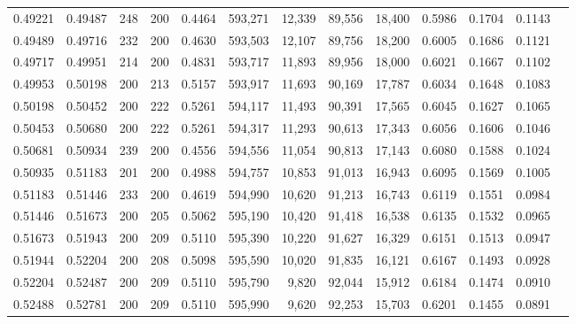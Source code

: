 \begin{tabular}{rrrrrrrrrrrrr}
0.49221 & 0.49487 &    248 & 200 &                                     0.4464 & 593,271 &  12,339 &  89,556 &  18,400 & 0.5986 & 0.1704 & 0.1143 \\
0.49489 & 0.49716 &    232 & 200 &                                     0.4630 & 593,503 &  12,107 &  89,756 &  18,200 & 0.6005 & 0.1686 & 0.1121 \\
0.49717 & 0.49951 &    214 & 200 &                                     0.4831 & 593,717 &  11,893 &  89,956 &  18,000 & 0.6021 & 0.1667 & 0.1102 \\
0.49953 & 0.50198 &    200 & 213 &                                     0.5157 & 593,917 &  11,693 &  90,169 &  17,787 & 0.6034 & 0.1648 & 0.1083 \\
0.50198 & 0.50452 &    200 & 222 &                                     0.5261 & 594,117 &  11,493 &  90,391 &  17,565 & 0.6045 & 0.1627 & 0.1065 \\
0.50453 & 0.50680 &    200 & 222 &                                     0.5261 & 594,317 &  11,293 &  90,613 &  17,343 & 0.6056 & 0.1606 & 0.1046 \\
0.50681 & 0.50934 &    239 & 200 &                                     0.4556 & 594,556 &  11,054 &  90,813 &  17,143 & 0.6080 & 0.1588 & 0.1024 \\
0.50935 & 0.51183 &    201 & 200 &                                     0.4988 & 594,757 &  10,853 &  91,013 &  16,943 & 0.6095 & 0.1569 & 0.1005 \\
0.51183 & 0.51446 &    233 & 200 &                                     0.4619 & 594,990 &  10,620 &  91,213 &  16,743 & 0.6119 & 0.1551 & 0.0984 \\
0.51446 & 0.51673 &    200 & 205 &                                     0.5062 & 595,190 &  10,420 &  91,418 &  16,538 & 0.6135 & 0.1532 & 0.0965 \\
0.51673 & 0.51943 &    200 & 209 &                                     0.5110 & 595,390 &  10,220 &  91,627 &  16,329 & 0.6151 & 0.1513 & 0.0947 \\
0.51944 & 0.52204 &    200 & 208 &                                     0.5098 & 595,590 &  10,020 &  91,835 &  16,121 & 0.6167 & 0.1493 & 0.0928 \\
0.52204 & 0.52487 &    200 & 209 &                                     0.5110 & 595,790 &   9,820 &  92,044 &  15,912 & 0.6184 & 0.1474 & 0.0910 \\
0.52488 & 0.52781 &    200 & 209 &                                     0.5110 & 595,990 &   9,620 &  92,253 &  15,703 & 0.6201 & 0.1455 & 0.0891 \\

\end{tabular}
